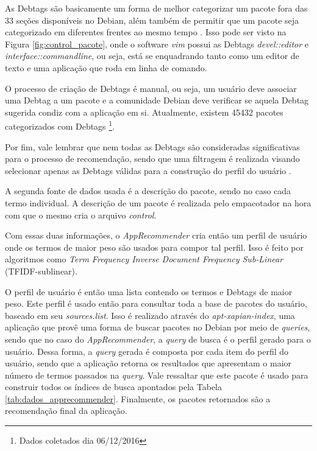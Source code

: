 As Debtags são basicamente um forma de melhor categorizar um pacote fora das 33
seções disponíveis no Debian, além também de permitir que um pacote seja
categorizado em diferentes frentes ao mesmo tempo \cite{zini2005cute}. Isso pode ser visto na Figura
\ref{fig:control_pacote}, onde o software \textit{vim} possui as Debtags
\textit{devel::editor} e \textit{interface::commandline}, ou seja, está se
enquadrando tanto como um editor de texto e uma aplicação que roda em linha de
comando.

O processo de criação de Debtags é manual, ou seja, um usuário deve associar uma
Debtag a um pacote e a comunidade Debian deve verificar se aquela Debtag
sugerida condiz com a aplicação em si. Atualmente, existem 45432 pacotes
categorizados com Debtags \footnote{Dados
coletados dia 06/12/2016}.

Por fim, vale lembrar que nem todas as Debtags são consideradas significativas
para o processo de recomendação, sendo que uma filtragem é realizada visando
selecionar apenas as Debtags válidas para a construção do perfil do usuário
\cite{araujo2011apprecommender}.

A segunda fonte de dados usada é a descrição do pacote, sendo no caso cada termo
individual. A descrição de um pacote é realizada pelo empacotador na hora com
que o mesmo cria o arquivo \textit{control}.

Com essas duas informações, o \textit{AppRecommender} cria então um perfil de usuário
onde os termos de maior peso são usados para compor tal perfil. Isso é feito por
algoritmos como \textit{Term Frequency Inverse Document Frequency Sub-Linear}
(TFIDF-sublinear).

O perfil de usuário é então uma lista contendo os termos e Debtags de maior
peso. Este perfil é usado então para consultar toda a base de pacotes
do usuário, baseado em seu \textit{sources.list}.
Isso é realizado através do \textit{apt-xapian-index}, uma aplicação
que provê uma forma de buscar pacotes no Debian por meio de \textit{queries}, sendo que no
caso do \textit{AppRecommender}, a \textit{query} de busca é o perfil gerado para o usuário. Dessa
forma, a \textit{query} gerada é composta por cada item do perfil do usuário, sendo que a
aplicação retorna os resultados que apresentam o maior número de termos passados
na \textit{query}.
Vale ressaltar que este pacote é usado para construir todos os índices de busca
apontados pela Tabela \ref{tab:dados_apprecommender}.
Finalmente, os pacotes retornados são a recomendação final da aplicação.

